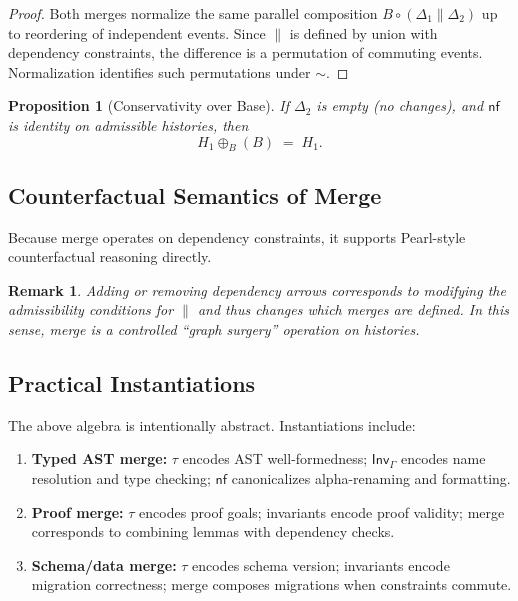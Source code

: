 \documentclass[11pt]{article}
\newtheorem{remark}{Remark}
\newtheorem{proposition}{Proposition}
\begin{document}
\begin{proof}
Both merges normalize the same parallel composition $B \circ (\Delta_1 \parallel \Delta_2)$ up to reordering of independent events. Since $\parallel$ is defined by union with dependency constraints, the difference is a permutation of commuting events. Normalization identifies such permutations under $\sim$.
\end{proof}

\begin{proposition}[Conservativity over Base]
If $\Delta_2$ is empty (no changes), and $\mathsf{nf}$ is identity on admissible histories, then
\[
H_1 \oplus_B (B) \;=\; H_1.
\]
\end{proposition}

\subsection{Counterfactual Semantics of Merge}

Because merge operates on dependency constraints, it supports Pearl-style counterfactual reasoning directly.

\begin{remark}
Adding or removing dependency arrows corresponds to modifying the admissibility conditions for $\parallel$ and thus changes which merges are defined. In this sense, merge is a controlled ``graph surgery'' operation on histories.
\end{remark}

\subsection{Practical Instantiations}

The above algebra is intentionally abstract. Instantiations include:
\begin{enumerate}
  \item \textbf{Typed AST merge:} $\tau$ encodes AST well-formedness; $\mathsf{Inv}_\Gamma$ encodes name resolution and type checking; $\mathsf{nf}$ canonicalizes alpha-renaming and formatting.
  \item \textbf{Proof merge:} $\tau$ encodes proof goals; invariants encode proof validity; merge corresponds to combining lemmas with dependency checks.
  \item \textbf{Schema/data merge:} $\tau$ encodes schema version; invariants encode migration correctness; merge composes migrations when constraints commute.
\end{enumerate}
\end{document}

